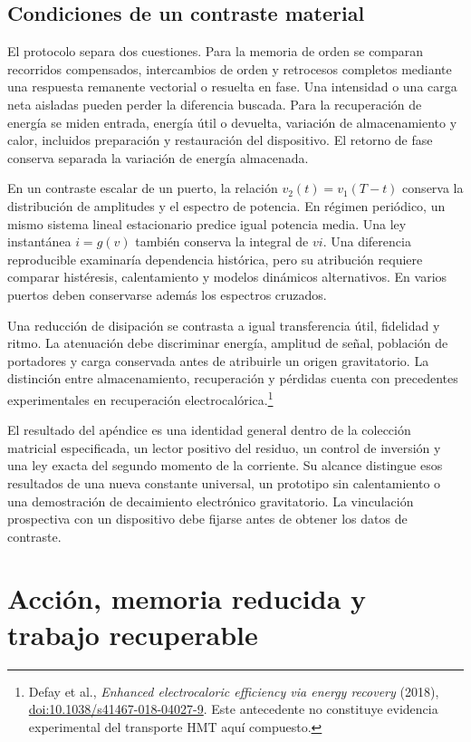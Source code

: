 \subsection{Condiciones de un contraste material}
\label{md:aux:contraste-material}

El protocolo separa dos cuestiones. Para la memoria de orden
se comparan recorridos compensados, intercambios de orden y
retrocesos completos mediante una respuesta remanente vectorial
o resuelta en fase. Una intensidad o una carga neta aisladas
pueden perder la diferencia buscada. Para la recuperación de
energía se miden entrada, energía útil o devuelta, variación
de almacenamiento y calor, incluidos preparación y restauración
del dispositivo. El retorno de fase conserva separada la
variación de energía almacenada.

En un contraste escalar de un puerto, la relación
$v_2(t)=v_1(T-t)$ conserva la distribución de amplitudes y el
espectro de potencia. En régimen periódico, un mismo sistema
lineal estacionario predice igual potencia media. Una ley
instantánea $i=g(v)$ también conserva la integral de $vi$.
Una diferencia reproducible examinaría dependencia histórica,
pero su atribución requiere comparar histéresis, calentamiento
y modelos dinámicos alternativos. En varios puertos deben
conservarse además los espectros cruzados.

Una reducción de disipación se contrasta a igual transferencia
útil, fidelidad y ritmo. La atenuación debe discriminar energía,
amplitud de señal, población de portadores y carga conservada
antes de atribuirle un origen gravitatorio. La distinción entre
almacenamiento, recuperación y pérdidas cuenta con precedentes
experimentales en recuperación electrocalórica.\footnote{Defay
et al., \emph{Enhanced electrocaloric efficiency via energy
recovery} (2018),
\href{https://doi.org/10.1038/s41467-018-04027-9}{doi:10.1038/s41467-018-04027-9}.
Este antecedente no constituye evidencia experimental del
transporte HMT aquí compuesto.}

El resultado del apéndice es una identidad general dentro
de la colección matricial especificada, un lector positivo del
residuo, un control de inversión y una ley exacta del segundo
momento de la corriente. Su alcance distingue esos resultados
de una nueva constante universal, un prototipo sin calentamiento
o una demostración de decaimiento electrónico gravitatorio.
La vinculación prospectiva con un dispositivo debe fijarse
antes de obtener los datos de contraste.

\section{Acción, memoria reducida y trabajo recuperable}
\label{md:aux:trabajo}

